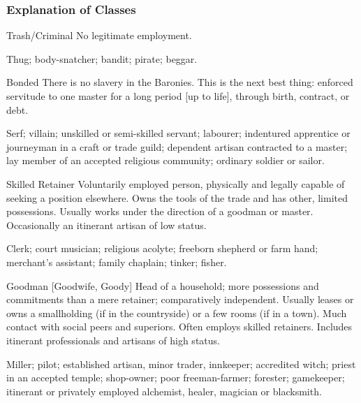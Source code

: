 \begin{multicols*}{3}
\subsubsection{Explanation of Classes}

\begin{Description}

\item[Trash/Criminal] No legitimate employment.

\begin{example}
Thug; body-snatcher; bandit; pirate; beggar.
\end{example}

\item[Bonded] There is no slavery in the Baronies. This is the next
best thing: enforced servitude to one master for a long period [up to
life], through birth, contract, or debt.

\begin{example}
Serf; villain; unskilled or semi-skilled servant; labourer;
indentured apprentice or journeyman in a craft or trade guild;
dependent artisan contracted to a master; lay member of an accepted
religious community; ordinary soldier or sailor.
\end{example}

\item[Skilled Retainer] Voluntarily employed person, physically and
legally capable of seeking a position elsewhere.  Owns the tools of
the trade and has other, limited possessions.  Usually works under the
direction of a goodman or master.  Occasionally an itinerant artisan
of low status.

\begin{example}
Clerk; court musician; religious acolyte; freeborn shepherd or farm
hand; merchant's assistant; family chaplain; tinker; fisher.
\end{example}

\item[Goodman {[}Goodwife, Goody{]}] Head of a household;
more possessions and commitments than a mere retainer; comparatively
independent.  Usually leases or owns a smallholding (if in the
countryside) or a few rooms (if in a town). Much contact with social
peers and superiors. Often employs skilled retainers.  Includes
itinerant professionals and artisans of high status.

\begin{example}
Miller; pilot; established artisan, minor trader, innkeeper;
accredited witch; priest in an accepted temple; shop-owner; poor
freeman-farmer; forester; gamekeeper; itinerant or privately employed
alchemist, healer, magician or blacksmith.
\end{example}


\end{Description}
\end{multicols*}
